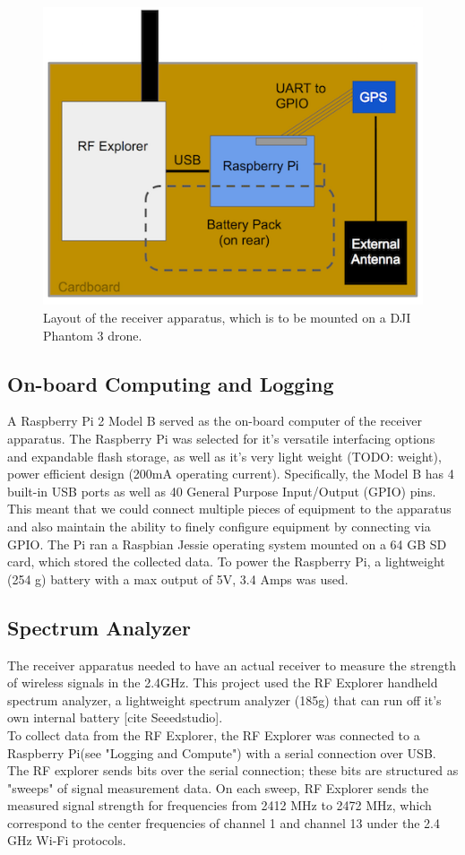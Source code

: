 \documentclass[pageno]{jpaper}
\begin{document}
\begin{figure}[h]
	\caption{Layout of the receiver apparatus, which is to be mounted on a DJI Phantom 3 drone.}
	\includegraphics{apparatus}
	\centering
\end{figure}

\subsection{On-board Computing and Logging}
A Raspberry Pi 2 Model B served as the on-board computer of the receiver apparatus. The Raspberry Pi was selected for it's versatile interfacing options and expandable flash storage, as well as it's very light weight (TODO: weight), power efficient design (200mA operating current). Specifically, the Model B has 4 built-in USB ports as well as 40 General Purpose Input/Output (GPIO) pins. This meant that we could connect multiple pieces of equipment to the apparatus and also maintain the ability to finely configure equipment by connecting via GPIO. The Pi ran a Raspbian Jessie operating system mounted on a 64 GB SD card, which stored the collected data. To power the Raspberry Pi, a lightweight (254 g) battery with a max output of 5V, 3.4 Amps was used. 

\subsection{Spectrum Analyzer}
The receiver apparatus needed to have an actual receiver to measure the strength of wireless signals in the 2.4GHz. This project used the RF Explorer handheld spectrum analyzer, a lightweight spectrum analyzer (185g) that can run off it's own internal battery [cite Seeedstudio].\\
To collect data from the RF Explorer, the RF Explorer was connected to a Raspberry Pi(see "Logging and Compute") with a serial connection over USB. The RF explorer sends bits over the serial connection; these bits are structured as "sweeps" of signal measurement data. On each sweep, RF Explorer sends the measured signal strength for frequencies from 2412 MHz to 2472 MHz, which correspond to the center frequencies of channel 1 and channel 13 under the 2.4 GHz Wi-Fi protocols.
\end{document}

